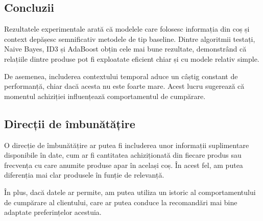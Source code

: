\documentclass[12pt,a4paper]{article}
\begin{document}
\subsection{Concluzii}

Rezultatele experimentale arată că modelele care folosesc informația din coș și context depășesc semnificativ metodele de tip baseline. Dintre algoritmii testați, Naive Bayes, ID3 și AdaBoost obțin cele mai bune rezultate, demonstrând că relațiile dintre produse pot fi exploatate eficient chiar și cu modele relativ simple.

De asemenea, includerea contextului temporal aduce un câștig constant de performanță, chiar dacă acesta nu este foarte mare. Acest lucru sugerează că momentul achiziției influențează comportamentul de cumpărare.


\subsection{Direcții de îmbunătățire}
O direcție de îmbunătățire ar putea fi includerea unor informații suplimentare disponibile în date, cum ar fi cantitatea achiziționată din fiecare produs sau frecvența cu care anumite produse apar în același coș.
În acest fel, am putea diferenția mai clar produsele în funție de relevanță.

În plus, dacă datele ar permite, am putea utiliza un istoric al comportamentului de cumpărare al clientului, care ar putea conduce la recomandări mai bine adaptate preferințelor acestuia.
\end{document}
